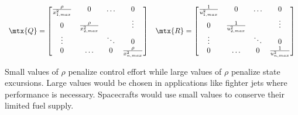 \begin{equation*}
  \begin{array}{cc}
    \mtx{Q} = \begin{bmatrix}
      \frac{\rho}{x_{1,max}^2} & 0 & \ldots & 0 \\
      0 & \frac{\rho}{x_{2,max}^2} & & \vdots \\
      \vdots & & \ddots & 0 \\
      0 & \ldots & 0 & \frac{\rho}{x_{n,max}^2}
    \end{bmatrix} &
    \mtx{R} = \begin{bmatrix}
      \frac{1}{u_{1,max}^2} & 0 & \ldots & 0 \\
      0 & \frac{1}{u_{2,max}^2} & & \vdots \\
      \vdots & & \ddots & 0 \\
      0 & \ldots & 0 & \frac{1}{u_{n,max}^2}
    \end{bmatrix}
  \end{array}
\end{equation*}

Small values of $\rho$ penalize \gls{control effort} while large values of
$\rho$ penalize \gls{state} excursions. Large values would be chosen in
applications like fighter jets where performance is necessary. Spacecrafts would
use small values to conserve their limited fuel supply.
